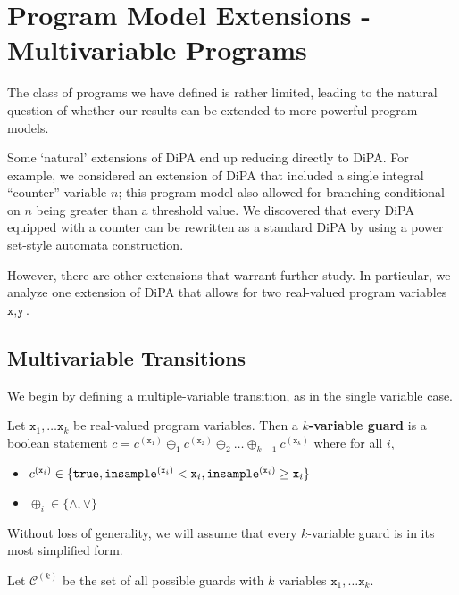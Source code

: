 
\section{Program Model Extensions - Multivariable Programs}



The class of programs we have defined is rather limited, leading to the natural question of whether our results can be extended to more powerful program models. 

Some `natural' extensions of DiPA end up reducing directly to DiPA. For example, we considered an extension of DiPA that included a single integral ``counter'' variable $n$; this program model also allowed for branching conditional on $n$ being greater than a threshold value. 
We discovered that every DiPA equipped with a counter can be rewritten as a standard DiPA by using a power set-style automata construction. 

However, there are other extensions that warrant further study. In particular, we analyze one extension of DiPA that allows for two real-valued program variables $\texttt{x}, \texttt{y}$.

\subsection{Multivariable Transitions}

We begin by defining a multiple-variable transition, as in the single variable case. 

\begin{defn}
    Let $\texttt{x}_1, \ldots \texttt{x}_k$ be real-valued program variables. Then a \textbf{$k$-variable guard} is a boolean statement $c = c^{(\texttt{x}_1)}\oplus_1 c^{(\texttt{x}_2)}\oplus_2\ldots\oplus_{k-1}c^{(\texttt{x}_k)}$ where for all $i$, \begin{itemize}
        \item $c^{(\texttt{x}_i)}\in \{\texttt{true}, \mvlguard[\texttt{x}_i], \mvgguard[\texttt{x}_i]\}$
        \item $\oplus_i \in \{\land, \lor\}$
    \end{itemize}
    Without loss of generality, we will assume that every $k$-variable guard is in its most simplified form. 
    
    

    Let $\mathcal{C}^{(k)}$ be the set of all possible guards with $k$ variables $\texttt{x}_1, \ldots \texttt{x}_k$.
\end{defn}

